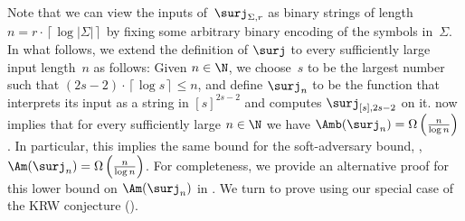 Note that we can view the inputs of~$\surj_{\Sigma,r}$ as binary
strings of length~$n=r\cdot\left\lceil \log\left|\Sigma\right|\right\rceil $
by fixing some arbitrary binary encoding of the symbols in~$\Sigma$.
In what follows, we extend the definition of $\surj$ to every sufficiently
large input length~$n$ as follows: Given $n\in\N$, we choose~$s$
to be the largest number such that $(2s-2)\cdot\left\lceil \log s\right\rceil \le n$,
and define $\surj_{n}$ to be the function that interprets its input
as a string in $\left[s\right]^{2s-2}$ and computes $\surj_{\left[s\right],2s-2}$
on it.  now implies that for every sufficiently large
$n\in\N$ we have $\Amb(\surj_{n})=\Omega\left(\frac{n}{\log n}\right)$.
In particular, this implies the same bound for the soft-adversary
bound, \ie, $\Am(\surj_{n})=\Omega\left(\frac{n}{\log n}\right)$.
For completeness, we provide an alternative proof for this lower bound
on $\Am(\surj_{n})$ in . We turn to prove
 using our special case of the KRW conjecture 
(). 
